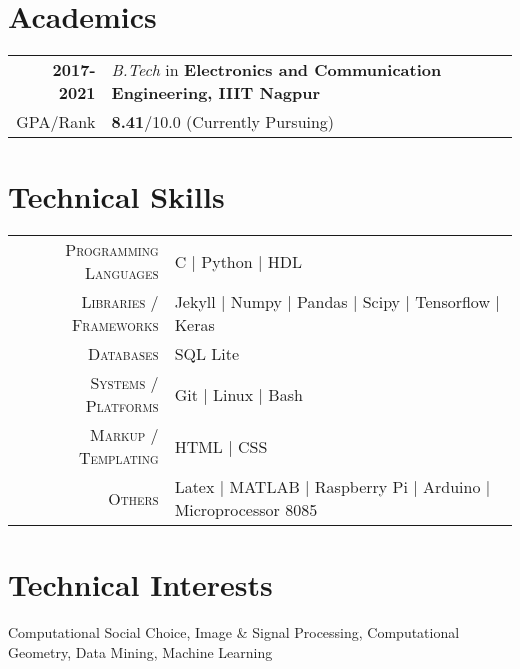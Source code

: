 \documentclass[a4paper,10pt]{extarticle} %
\begin{document}
\section{\textcolor{primary}{Academics}}
\vspace{0.2cm}
\begin{tabular}{r|p{17.5cm}}	
\textbf{2017-2021} & \textit{B.Tech} in \textbf{Electronics and Communication Engineering, IIIT Nagpur}\\
\hfill GPA/Rank & \textbf{8.41}/10.0 (Currently Pursuing) %
\end{tabular}

\vspace{0.2cm}
\section{\textcolor{primary}{Technical Skills}}
\vspace{0.2cm}
\begin{tabular}{r|p{15cm}}
\textsc{Programming Languages} & C | Python | HDL  \\
\textsc{Libraries / Frameworks} & Jekyll | Numpy | Pandas | Scipy | Tensorflow | Keras\\
\textsc{Databases} & SQL Lite \\
\textsc{Systems / Platforms} & Git | Linux | Bash\\
\textsc{Markup / Templating} & HTML | CSS \\
\textsc{Others} &  Latex | MATLAB | Raspberry Pi | Arduino | Microprocessor 8085
\end{tabular}

%
\vspace{0.2cm}
\section{\textcolor{primary}{Technical Interests}}
\vspace{0.2cm}
\noindent Computational Social Choice, Image \& Signal Processing, Computational Geometry, Data Mining, Machine Learning
\end{document}
